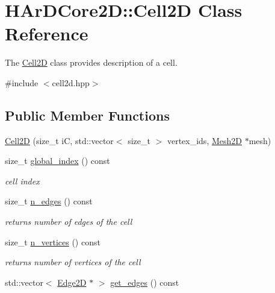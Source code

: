 \hypertarget{classHArDCore2D_1_1Cell2D}{}\section{H\+Ar\+D\+Core2D\+:\+:Cell2D Class Reference}
\label{classHArDCore2D_1_1Cell2D}


The \hyperlink{classHArDCore2D_1_1Cell2D}{Cell2D} class provides description of a cell.  




{\ttfamily \#include $<$cell2d.\+hpp$>$}

\subsection*{Public Member Functions}
\begin{DoxyCompactItemize}
\item 
\hyperlink{classHArDCore2D_1_1Cell2D_a6c10c6ca8ed2368091ce15af8e455d4e}{Cell2D} (size\+\_\+t iC, std\+::vector$<$ size\+\_\+t $>$ vertex\+\_\+ids, \hyperlink{classHArDCore2D_1_1Mesh2D}{Mesh2D} $\ast$mesh)
\item 
size\+\_\+t \hyperlink{group__Mesh2D_ga5c51190fdf2037fd2d6289f4c7f583e0}{global\+\_\+index} () const
\begin{DoxyCompactList}\small\item\em cell index \end{DoxyCompactList}\item 
size\+\_\+t \hyperlink{group__Mesh2D_ga75aafeb4e614e1cfeb1ffb916a69914f}{n\+\_\+edges} () const
\begin{DoxyCompactList}\small\item\em returns number of edges of the cell \end{DoxyCompactList}\item 
size\+\_\+t \hyperlink{group__Mesh2D_gabf4709ed50e4797691a5124d625e6436}{n\+\_\+vertices} () const
\begin{DoxyCompactList}\small\item\em returns number of vertices of the cell \end{DoxyCompactList}\item 
\mbox{\label{classHArDCore2D_1_1Cell2D_ad3c7842a181976770dff4d8ce71c525d}} 
std\+::vector$<$ \hyperlink{classHArDCore2D_1_1Edge2D}{Edge2D} $\ast$ $>$ \hyperlink{classHArDCore2D_1_1Cell2D_ad3c7842a181976770dff4d8ce71c525d}{get\+\_\+edges} () const

\end{DoxyCompactItemize}

